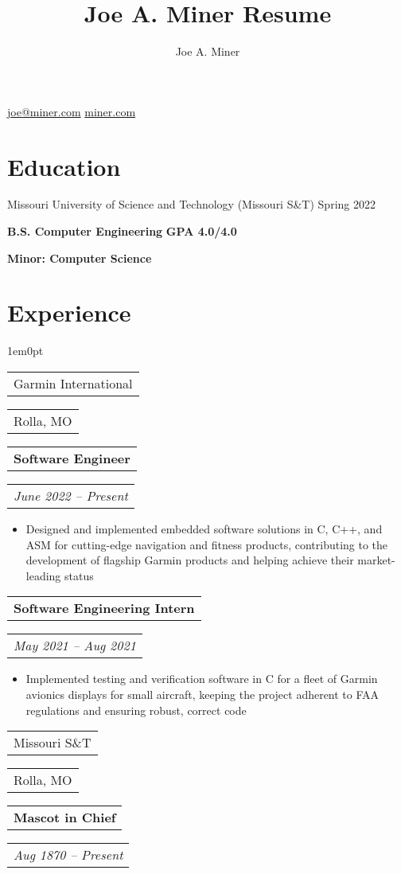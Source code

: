 \documentclass{article}
\makeatletter
\def\indentamount{1em}
\renewcommand{\maketitle}{
    \begin{center}
    {\huge\bfseries\theauthor}

    \vspace{.6em}

    \href{mailto:joe@miner.com}{joe@miner.com} 
    \quad
    \href{https://miner.com}{miner.com}

    \vspace{-.8em}
    \end{center}
}
\newcommand{\getsubsection}[2]{
    \noindent
    \begin{tabular}[t]{@{}l} 
        \large{#1}
    \end{tabular}
    \hfill
    \begin{tabular}[t]{l@{}}
        #2
    \end{tabular}
}
\newcommand{\getsubsubsection}[2]{
    \noindent
    \begin{tabular}[t]{@{}l} 
        \textbf{#1}
    \end{tabular}
    \hfill
    \begin{tabular}[t]{l@{}}
        \emph{#2}
    \end{tabular}
}
\newenvironment{ul}{
    \begin{itemize}[topsep=\parskip, partopsep=\parskip]
    \itemsep-.12em
    \let\olditem\item
    \renewcommand\item{\olditem}
}{
    \vspace{.45em}
    \end{itemize}
}
\makeatother
\begin{document}
\title{Joe A. Miner Resume}
\author{Joe A. Miner}

\maketitle

\section{Education}

Missouri University of Science and Technology (Missouri S\&T) 
\hfill
Spring 2022

\textbf{B.S. Computer Engineering}
\hfill
\textbf{GPA 4.0/4.0}

\textbf{Minor: Computer Science}

\section{Experience}

\begin{adjustwidth}{\indentamount}{0pt}

\getsubsection{Garmin International}{Rolla, MO}

\getsubsubsection{Software Engineer}{June 2022 -- Present}

\begin{ul}
    \item{Designed and implemented embedded software solutions in C, C++, and ASM for cutting-edge navigation and fitness products, contributing to the development of flagship Garmin products and helping achieve their market-leading status}
    \vspace{-1.7em}
\end{ul}

\getsubsubsection{Software Engineering Intern}{May 2021 -- Aug 2021}

\begin{ul}
    \item{Implemented testing and verification software in C for a fleet of Garmin avionics displays for small aircraft, keeping the project adherent to FAA regulations and ensuring robust, correct code}
\end{ul}

\end{adjustwidth}

\getsubsection{Missouri S\&T}{Rolla, MO}

\getsubsubsection{Mascot in Chief}{Aug 1870 -- Present}
\end{document}
